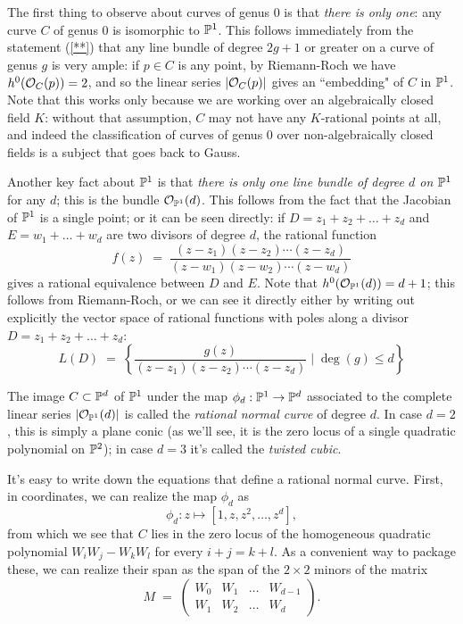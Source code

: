 The first thing to observe about curves of genus 0 is that \emph{there is only one}: any curve $C$ of genus 0 is isomorphic to $\PP^1$. This follows immediately from the statement (\ref{**}) that any line bundle of degree $2g+1$ or greater on a curve of genus $g$ is very ample: if $p \in C$ is any point, by Riemann-Roch we have $h^0(\cO_C(p)) = 2$, and so the linear series $|\cO_C(p)|$ gives an ``embedding" of $C$ in $\PP^1$. Note that this works only because we are working over an algebraically closed field $K$: without that assumption, $C$ may not have any $K$-rational points at all, and indeed the classification of curves of genus 0 over non-algebraically closed fields is a subject that goes back to Gauss.

Another key fact about $\PP^1$ is that \emph{there is only one line bundle of degree $d$ on $\PP^1$} for any $d$; this is the bundle $\cO_{\PP^1}(d)$. This follows from the fact that the Jacobian of $\PP^1$ is a single point; or it can be seen directly: if $D = z_1+z_2+\dots+z_d$ and $E = w_1+\dots+w_d$ are two divisors of degree $d$, the rational function
$$
f(z) \; = \; \frac{(z-z_1)(z-z_2)\cdots(z-z_d)}{(z-w_1)(z-w_2)\cdots(z-w_d)}
$$
gives a rational equivalence between $D$ and $E$. Note that $h^0(\cO_{\PP^1}(d)) = d+1$; this follows from Riemann-Roch, or we can see it directly either by writing out explicitly the vector space of rational functions with poles along a divisor $D = z_1+z_2+\dots+z_d$:
$$
L(D) \; = \; \left\{ \frac{g(z)}{(z-z_1)(z-z_2)\cdots(z-z_d)} \mid \deg(g) \leq d \right\}
$$

The image $C \subset \PP^d$ of $\PP^1$ under the map $\phi_d : \PP^1 \to \PP^d$ associated to the complete linear series $|\cO_{\PP^1}(d)|$ is called the \emph{rational normal curve} of degree $d$. In case $d=2$, this is simply a plane conic (as we'll see, it is the zero locus of a single quadratic polynomial on $\PP^2$); in case $d=3$ it's called the \emph{twisted cubic}.

It's easy to write down the equations that define a rational normal curve. First, in coordinates, we can realize the map $\phi_d$ as
$$
\phi_d : z \mapsto [1, z, z^2,\dots,z^d],
$$
from which we see that $C$ lies in the zero locus of the homogeneous quadratic polynomial $W_iW_j - W_kW_l$ for every $i+j=k+l$. As a convenient way to package these, we can realize their span as the span of the $2\times 2$ minors of the matrix
$$
M \; = \; \begin{pmatrix}
W_0 & W_1 & \dots & W_{d-1} \\
W_1 & W_2 & \dots & W_d
\end{pmatrix}.
$$

